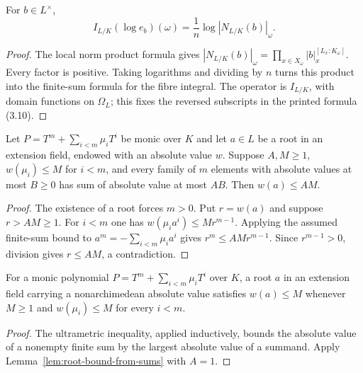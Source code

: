 \begin{lemma}\label{lem:fibre-log-norm}
\leanok
{}
For $b\in L^\times$,
\[
 I_{L/K}(\log e_b)(\omega)
 =\frac1n\log|N_{L/K}(b)|_\omega.
\]
\end{lemma}
\begin{proof}
The local norm product formula gives
$|N_{L/K}(b)|_\omega=\prod_{x\in X_\omega}|b|_x^{[L_x:K_\omega]}$.
Every factor is positive. Taking logarithms and dividing by $n$
turns this product into the finite-sum formula for the fibre integral.
The operator is $I_{L/K}$, with domain functions on $\Omega_L$; this
fixes the reversed subscripts in the printed formula (3.10).
\end{proof}

\begin{lemma}\label{lem:root-bound-from-sums}
\leanok
{}
Let $P=T^m+\sum_{i<m}\mu_iT^i$ be monic over $K$ and let $a\in L$
be a root in an extension field, endowed with an absolute value $w$.
Suppose $A,M\geq1$, $w(\mu_i)\leq M$ for $i<m$, and every family
of $m$ elements with absolute values at most $B\geq0$ has sum of
absolute value at most $AB$. Then $w(a)\leq AM$.
\end{lemma}
\begin{proof}
The existence of a root forces $m>0$. Put $r=w(a)$ and suppose
$r>AM\geq1$. For $i<m$ one has $w(\mu_i a^i)\leq Mr^{m-1}$.
Applying the assumed finite-sum bound to
$a^m=-\sum_{i<m}\mu_i a^i$ gives $r^m\leq AMr^{m-1}$.
Since $r^{m-1}>0$, division gives $r\leq AM$, a contradiction.
\end{proof}

\begin{lemma}\label{lem:nonarchimedean-root-bound}
\leanok
{}
For a monic polynomial $P=T^m+\sum_{i<m}\mu_iT^i$ over $K$,
a root $a$ in an extension field carrying a nonarchimedean absolute
value satisfies $w(a)\leq M$ whenever $M\geq1$ and
$w(\mu_i)\leq M$ for every $i<m$.
\end{lemma}
\begin{proof}
The ultrametric inequality, applied inductively, bounds the absolute
value of a nonempty finite sum by the largest absolute value of a
summand. Apply Lemma~\ref{lem:root-bound-from-sums} with $A=1$.
\end{proof}

